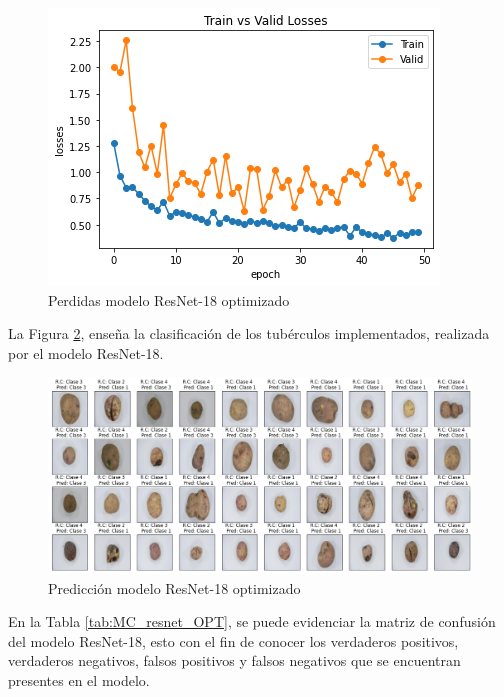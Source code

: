 \newpage
\begin{figure}[ht]
	\centering
	\includegraphics[scale=0.6]{Figs/513.png}
	\caption{Perdidas modelo ResNet-18 optimizado}
	\label{fig:perdda_REs_opt}
\end{figure}
La Figura \ref{fig:pre_res_opt}, enseña la clasificación de los tubérculos implementados, realizada por el modelo ResNet-18.
\begin{figure}[ht]
	\centering
	\includegraphics[scale=0.4]{Figs/514.png}
	\caption{Predicción modelo ResNet-18 optimizado}
	\label{fig:pre_res_opt}
\end{figure}

En la Tabla \ref{tab:MC_resnet_OPT}, se puede evidenciar la matriz de confusión del modelo ResNet-18, esto con el fin de conocer los verdaderos positivos, verdaderos negativos, falsos positivos y falsos negativos que se encuentran presentes en el modelo.

